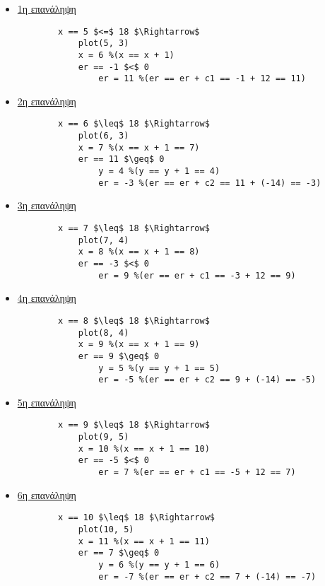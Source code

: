 \begin{solution}
\lstset{style=tt} 

\begin{itemize}
  \item \underline{1η επανάληψη}

		\begin{lstlisting}
		x == 5 $<=$ 18 $\Rightarrow$
			plot(5, 3) 
			x = 6 %(x == x + 1) 
			er == -1 $<$ 0 
				er = 11 %(er == er + c1 == -1 + 12 == 11)
		\end{lstlisting}
		
	\item \underline{2η επανάληψη}
		
		\begin{lstlisting}
		x == 6 $\leq$ 18 $\Rightarrow$
			plot(6, 3)
			x = 7 %(x == x + 1 == 7)
			er == 11 $\geq$ 0 
				y = 4 %(y == y + 1 == 4)
				er = -3 %(er == er + c2 == 11 + (-14) == -3)
		\end{lstlisting}		
				
	\item \underline{3η επανάληψη}
		\begin{lstlisting}
		x == 7 $\leq$ 18 $\Rightarrow$
			plot(7, 4)
			x = 8 %(x == x + 1 == 8)
			er == -3 $<$ 0 
				er = 9 %(er == er + c1 == -3 + 12 == 9)
		\end{lstlisting}		
		
	\item \underline{4η επανάληψη}
		\begin{lstlisting}
		x == 8 $\leq$ 18 $\Rightarrow$
			plot(8, 4)
			x = 9 %(x == x + 1 == 9)
			er == 9 $\geq$ 0 
				y = 5 %(y == y + 1 == 5)
				er = -5 %(er == er + c2 == 9 + (-14) == -5)
		\end{lstlisting}
				
	\item \underline{5η επανάληψη}
		\begin{lstlisting}
		x == 9 $\leq$ 18 $\Rightarrow$
			plot(9, 5)
			x = 10 %(x == x + 1 == 10)
			er == -5 $<$ 0 
				er = 7 %(er == er + c1 == -5 + 12 == 7)
		\end{lstlisting}
		
	\item \underline{6η επανάληψη}
		\begin{lstlisting}
		x == 10 $\leq$ 18 $\Rightarrow$
			plot(10, 5)
			x = 11 %(x == x + 1 == 11)
			er == 7 $\geq$ 0 
				y = 6 %(y == y + 1 == 6)
				er = -7 %(er == er + c2 == 7 + (-14) == -7)
		\end{lstlisting}
\end{itemize}


\end{solution}
